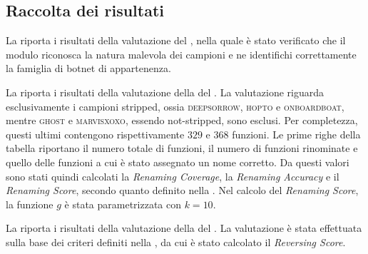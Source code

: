 
\subsection{Raccolta dei risultati} %

La  riporta i risultati della valutazione del \classifier{}, nella quale è stato verificato che il modulo riconosca la natura malevola dei campioni e ne identifichi correttamente la famiglia di botnet di appartenenza.

\begin{table}[t]
    \centering
    \caption[Risultati della valutazione del \classifier{}]{Risultati della valutazione del \classifier{}.}
    \label{tab:classifier_scores}
\end{table}

La  riporta i risultati della valutazione della \renaming{} del \sreagent{}. La valutazione riguarda esclusivamente i campioni stripped, ossia \textsc{deepsorrow}, \textsc{hopto} e \textsc{onboardboat}, mentre \textsc{ghost} e \textsc{marvisxoxo}, essendo not-stripped, sono esclusi. Per completezza, questi ultimi contengono rispettivamente $329$ e $368$ funzioni. Le prime righe della tabella riportano il numero totale di funzioni, il numero di funzioni rinominate e quello delle funzioni a cui è stato assegnato un nome corretto. Da questi valori sono stati quindi calcolati la \emph{Renaming Coverage}, la \emph{Renaming Accuracy} e il \emph{Renaming Score}, secondo quanto definito nella . Nel calcolo del \emph{Renaming Score}, la funzione $g$ è stata parametrizzata con $k=10$.

\begin{table}[t]
    \centering
    \caption[Risultati della valutazione della \renaming{}]{Risultati della valutazione della \renaming{}.}
    \label{tab:renaming_scores}
\end{table}

La  riporta i risultati della valutazione della \reversing{} del \sreagent{}. La valutazione è stata effettuata sulla base dei criteri definiti nella , da cui è stato calcolato il \emph{Reversing Score}.

